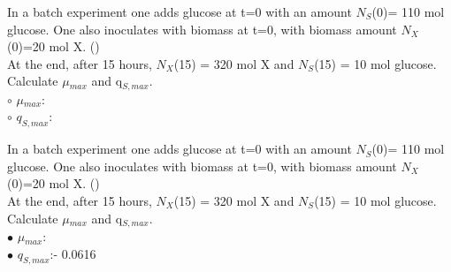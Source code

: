 \documentclass[]{beamer}
\begin{document}
\begin{frame}[shrink] {}
\color{blue}
In a batch experiment one adds glucose at t=0 with an amount $N_{S}$(0)= 110 mol glucose. One also inoculates with biomass at t=0, with biomass amount $N_{X}$(0)=20 mol X. ({\color{red}{Q9}})\\
At the end, after 15 hours, $N_{X}$(15) = 320 mol X and $N_{S}$(15) = 10 mol glucose.  \\
Calculate $\mu$$_{max}$ and q$_{S,max}$.  \\[.5em]
\color{black}
\setlength{\parindent}{-0.4cm}
{\color{red}$\circ$} $\mu$$_{max}$:\quad  \\
{\color{red}$\circ$} $q_{S,max}$:\quad \\
\end{frame}
\begin{frame}[shrink] {}
\color{blue}
In a batch experiment one adds glucose at t=0 with an amount $N_{S}$(0)= 110 mol glucose. One also inoculates with biomass at t=0, with biomass amount $N_{X}$(0)=20 mol X. ({\color{green}{Q9}})\\
At the end, after 15 hours, $N_{X}$(15) = 320 mol X and $N_{S}$(15) = 10 mol glucose.  \\
Calculate $\mu$$_{max}$ and q$_{S,max}$.  \\[.5em]
\color{black}
\setlength{\parindent}{-0.4cm}
{\color{red}$\bullet$} $\mu$$_{max}$:  \\
{\color{red}$\bullet$} $q_{S,max}$:\quad - 0.0616 \\
\end{frame}
\end{document}
